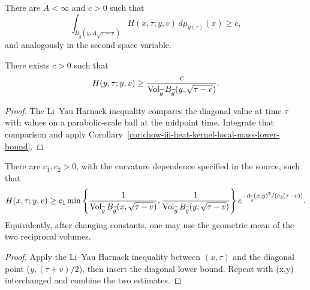 \begin{corollary}
\label{cor:chow-iii-heat-kernel-local-mass-lower-bound}


There are \(A<\infty\) and \(c>0\) such that
\[
 \int_{B_{\widetilde g}(y,A\sqrt{\tau-v})}H(x,\tau;y,v)
 \,d\mu_{g(\tau)}(x)\ge c,
\]
and analogously in the second space variable.
\end{corollary}

\begin{lemma}
\label{lem:chow-iii-evolving-heat-kernel-diagonal-lower-bound}


There exists \(c>0\) such that
\[
 H(y,\tau;y,v)\ge
 \frac{c}{\operatorname{Vol}_{\widetilde g}B_{\widetilde g}(y,\sqrt{\tau-v})}.
\]
\end{lemma}
\begin{proof}
\sketch The Li--Yau Harnack inequality compares the diagonal value at time \(\tau\)
with values on a parabolic-scale ball at the midpoint time.  Integrate that
comparison and apply Corollary~\ref{cor:chow-iii-heat-kernel-local-mass-lower-bound}.
\end{proof}

\begin{theorem}
\label{thm:chow-iii-evolving-heat-kernel-gaussian-lower-bound}


There are \(c_1,c_2>0\), with the curvature dependence specified in the
source, such that
\[
 H(x,\tau;y,v)\ge c_1
 \min\left\{
 \frac1{\operatorname{Vol}_{\widetilde g}B_{\widetilde g}(x,\sqrt{\tau-v})},
 \frac1{\operatorname{Vol}_{\widetilde g}B_{\widetilde g}(y,\sqrt{\tau-v})}
 \right\}
 e^{-d_{\widetilde g}(x,y)^2/(c_2(\tau-v))}.
\]
Equivalently, after changing constants, one may use the geometric mean of
the two reciprocal volumes.
\end{theorem}
\begin{proof}
\sketch Apply the Li--Yau Harnack inequality between \((x,\tau)\) and the diagonal
point (\(y,(\tau+v)/2\)), then insert the diagonal lower bound.  Repeat with
(x,y) interchanged and combine the two estimates.
\end{proof}


